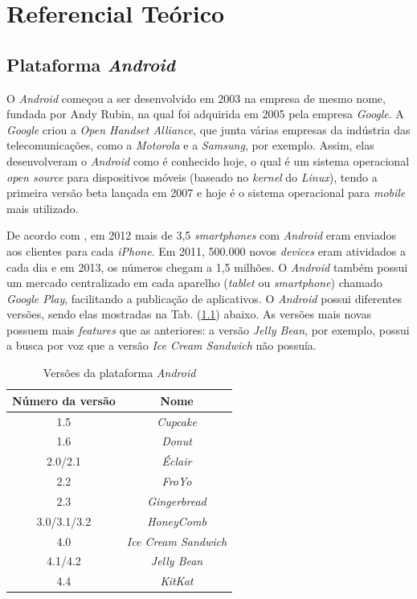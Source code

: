 \chapter[Referencial Teórico]{Referencial Teórico}

\section{Plataforma \textit{Android}}

	O \textit{Android} começou a ser desenvolvido em 2003 na empresa de mesmo nome, fundada por Andy Rubin, na qual foi adquirida em 2005 pela empresa \textit{Google}. A \textit{Google} criou a \textit{Open Handset Alliance}, que junta várias empresas da indústria das telecomunicações, como a \textit{Motorola} e a \textit{Samsung}, por exemplo. Assim, elas desenvolveram o \textit{Android} como é conhecido hoje, o qual é um sistema operacional  \textit{open source} para dispositivos móveis (baseado no \textit{kernel} do \textit{Linux}), tendo a primeira versão beta lançada em 2007 e hoje é o sistema operacional para \textit{mobile} mais utilizado.

	 De acordo com \cite{android2013}, em 2012 mais de 3,5 \textit{smartphones} com \textit{Android} eram enviados aos clientes para cada \textit{iPhone}. Em 2011, 500.000 novos \textit{devices} eram atividados a cada dia e em 2013, os números chegam a 1,5 milhões. O \textit{Android} também possui um mercado centralizado em cada aparelho (\textit{tablet} ou \textit{smartphone}) chamado \textit{Google Play}, facilitando a publicação de aplicativos. 
	O \textit{Android}  possui diferentes versões, sendo elas mostradas na Tab. (\ref{androidTab}) abaixo.  As versões mais novas possuem mais \textit{features} que as anteriores: a versão \textit{Jelly Bean}, por exemplo, possui a busca por voz que a versão \textit{Ice Cream Sandwich} não possuía. 

\begin{table}[h]
	\centering	
	\begin{tabular}{cc}
		\toprule
		\textbf{Número da versão} & \textbf{Nome}  \\
		\midrule
		1.5 &  \textit{Cupcake} \\
		1.6 & \textit{Donut} \\
		2.0/2.1 &  \textit{Éclair} \\
		2.2 & \textit{FroYo} \\
		2.3 &  \textit{Gingerbread} \\
		3.0/3.1/3.2 & \textit{HoneyComb} \\
		4.0 & \textit{Ice Cream Sandwich} \\
		4.1/4.2 & \textit{Jelly Bean} \\
		4.4 &  \textit{KitKat} \\

		\bottomrule
	\end{tabular}
	\caption{ Versões da plataforma \textit{Android}}
	\label{androidTab}
\end{table}

